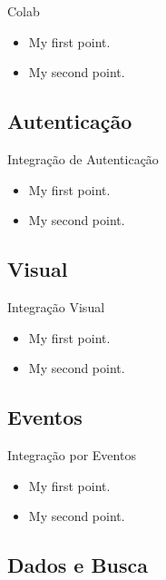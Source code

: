 \documentclass{beamer}
\begin{document}
\begin{frame}{Colab}
  \begin{itemize}
  \item {
    My first point.
  }
  \item {
    My second point.
  }
  \end{itemize}
\end{frame}

\subsection{Autenticação}

\begin{frame}{Integração de Autenticação}
  \begin{itemize}
  \item {
    My first point.
  }
  \item {
    My second point.
  }
  \end{itemize}
\end{frame}

\subsection{Visual}

\begin{frame}{Integração Visual}
  \begin{itemize}
  \item {
    My first point.
  }
  \item {
    My second point.
  }
  \end{itemize}
\end{frame}

\subsection{Eventos}

\begin{frame}{Integração por Eventos}
  \begin{itemize}
  \item {
    My first point.
  }
  \item {
    My second point.
  }
  \end{itemize}
\end{frame}

\subsection{Dados e Busca}
\end{document}
